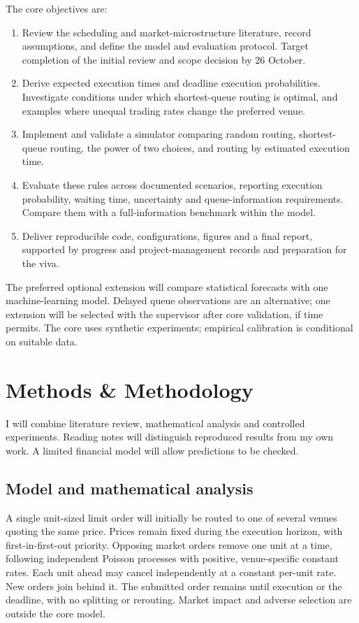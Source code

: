 \documentclass[10pt,a4paper,oneside]{article}
\begin{document}
The core objectives are:
\begin{enumerate}
\item Review the scheduling and market-microstructure literature, record assumptions, and define the model and evaluation protocol. Target completion of the initial review and scope decision by 26 October.
\item Derive expected execution times and deadline execution probabilities. Investigate conditions under which shortest-queue routing is optimal, and examples where unequal trading rates change the preferred venue.
\item Implement and validate a simulator comparing random routing, shortest-queue routing, the power of two choices, and routing by estimated execution time.
\item Evaluate these rules across documented scenarios, reporting execution probability, waiting time, uncertainty and queue-information requirements. Compare them with a full-information benchmark within the model.
\item Deliver reproducible code, configurations, figures and a final report, supported by progress and project-management records and preparation for the viva.
\end{enumerate}

The preferred optional extension will compare statistical forecasts with one machine-learning model. Delayed queue observations are an alternative; one extension will be selected with the supervisor after core validation, if time permits. The core uses synthetic experiments; empirical calibration is conditional on suitable data.

\section{Methods \& Methodology}

I will combine literature review, mathematical analysis and controlled experiments. Reading notes will distinguish reproduced results from my own work. A limited financial model will allow predictions to be checked.

\subsection*{Model and mathematical analysis}

A single unit-sized limit order will initially be routed to one of several venues quoting the same price. Prices remain fixed during the execution horizon, with first-in-first-out priority. Opposing market orders remove one unit at a time, following independent Poisson processes with positive, venue-specific constant rates. Each unit ahead may cancel independently at a constant per-unit rate. New orders join behind it. The submitted order remains until execution or the deadline, with no splitting or rerouting. Market impact and adverse selection are outside the core model.
\end{document}
